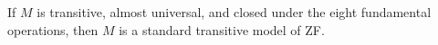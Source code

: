 If $M$ is transitive, almost universal, and closed under the eight fundamental operations, then $M$ is a standard transitive model of ZF.
